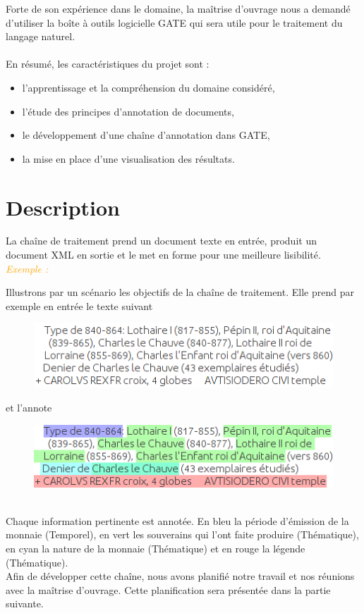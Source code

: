 \documentclass[a4paper, 11pt]{report}
\newenvironment{exemple}
    {
    \textit{\textcolor{orange}{
    Exemple : \\}}
    }
    {~\\
    }
\begin{document}
Forte de son expérience dans le domaine, la maîtrise d'ouvrage nous a demandé d'utiliser la boîte à outils logicielle GATE qui sera utile pour le traitement du langage naturel.\\~\\

En résumé, les caractéristiques du projet sont : 
\begin{itemize}
\item l'apprentissage et la compréhension du domaine considéré,
\item l'étude des principes d'annotation de documents,
\item le développement d'une chaîne d'annotation dans GATE,
\item la mise en place d'une visualisation des résultats.
\end{itemize}

\newpage
    \section{Description}
    La chaîne de traitement prend un document texte en entrée, produit un document XML en sortie et le met en forme pour une meilleure lisibilité.\\
    \begin{exemple}
\noindent Illustrons par un scénario les objectifs de la chaîne de traitement.
Elle prend par exemple en entrée le texte suivant

\begin{figure}[h!]
\centering
\includegraphics[scale=.5]{img/exemple_text.png}
\end{figure}

et l'annote
\end{exemple}
\begin{figure}[h!]
\centering
\includegraphics[scale=.5]{img/exemple_text_ann.png} 
\end{figure}\\
Chaque information pertinente est annotée. En bleu la période d'émission de la monnaie (Temporel), en vert les souverains qui l'ont faite produire (Thématique), en cyan la nature de la monnaie (Thématique) et en rouge la légende (Thématique).\\
Afin de développer cette chaîne, nous avons planifié notre travail et nos réunions avec la maîtrise d'ouvrage. Cette planification sera présentée dans la partie suivante.
\end{document}
